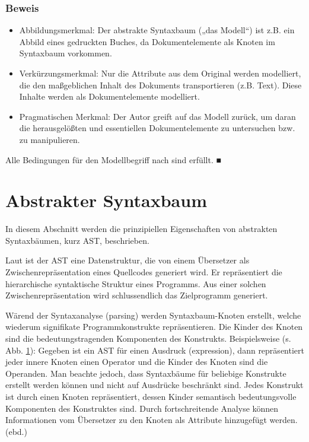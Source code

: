  
\subsubsection{Beweis}\label{}

 
\begin{itemize}

\item
Abbildungsmerkmal: Der abstrakte Syntaxbaum („das Modell“) ist z.B. ein Abbild eines gedruckten Buches, da Dokumentelemente als Knoten im Syntaxbaum vorkommen.


\item
Verkürzungsmerkmal: Nur die Attribute aus dem Original werden modelliert, die den maßgeblichen Inhalt des Dokuments transportieren (z.B. Text). Diese Inhalte werden als Dokumentelemente modelliert.


\item
Pragmatischen Merkmal: Der Autor greift auf das Modell zurück, um daran die herausgelößten und essentiellen Dokumentelemente zu untersuchen bzw. zu manipulieren.


\end{itemize}
 
Alle Bedingungen für den Modellbegriff nach \citep{Stachowiak} sind erfüllt. ■

 
\section{Abstrakter Syntaxbaum}\label{ast}
 
In diesem Abschnitt werden die prinzipiellen Eigenschaften von abstrakten Syntaxbäumen, kurz AST, beschrieben.

 
Laut \citep{Aho} ist der AST eine Datenstruktur, die von einem Übersetzer als Zwischenrepräsentation eines Quellcodes generiert wird. Er repräsentiert die hierarchische syntaktische Struktur eines Programms. Aus einer solchen Zwischenrepräsentation wird schlussendlich das Zielprogramm generiert.

 
Wärend der Syntaxanalyse (parsing) werden Syntaxbaum-Knoten erstellt, welche wiederum signifikate Programmkonstrukte repräsentieren. Die Kinder des Knoten sind die bedeutungstragenden Komponenten des Konstrukts. Beispielsweise (s. Abb. \ref{ast}): Gegeben ist ein AST für einen Ausdruck (expression), dann repräsentiert jeder innere Knoten einen Operator und die Kinder des Knoten sind die Operanden. Man beachte jedoch, dass Syntaxbäume für beliebige Konstrukte erstellt werden können und nicht auf Ausdrücke beschränkt sind. Jedes Konstrukt ist durch einen Knoten repräsentiert, dessen Kinder semantisch bedeutungsvolle Komponenten des Konstruktes sind. Durch fortschreitende Analyse können Informationen vom Übersetzer zu den Knoten als Attribute hinzugefügt werden. (ebd.)

